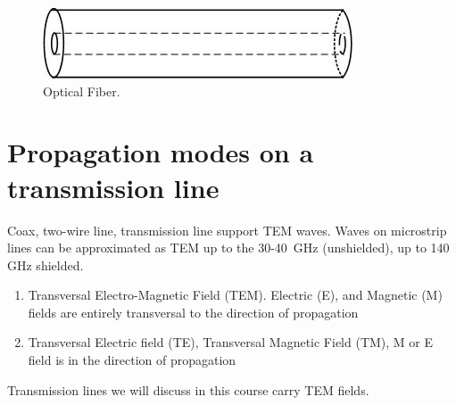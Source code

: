 \documentclass{ximera}
\begin{document}
\begin{figure}[ht!]
\begin{center}
\includegraphics[scale=0.4]{../jpg/fiber.jpg}
\caption{\label{fig:qm/OF} Optical Fiber.}
\end{center}
\end{figure}


\section{Propagation modes on a transmission line}

Coax, two-wire line, transmission line support TEM waves. Waves on microstrip lines can be approximated as TEM up to the 30-40\, GHz (unshielded), up to 140\,GHz shielded.




\begin{enumerate}
\item Transversal Electro-Magnetic Field (TEM). Electric (E), and Magnetic (M) fields are entirely transversal to the direction of
propagation
\item Transversal Electric field (TE), Transversal Magnetic Field (TM),  M or E field is in the direction of propagation
\end{enumerate}

Transmission lines we will discuss in this course carry TEM fields.

\end{document}
